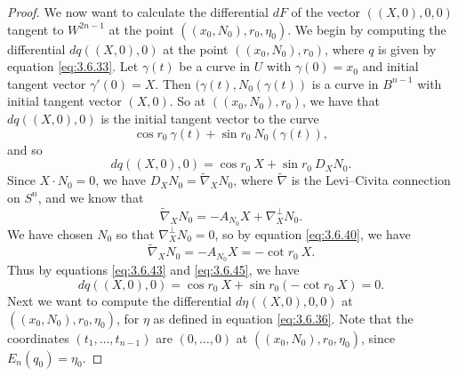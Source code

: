 \documentclass[12pt]{article}
\begin{document}
\begin{proof}
We now want to calculate the differential $dF$ of the vector $((X,0),0,0)$ tangent to 
$W^{2n-1}$ at the point $((x_0,N_0),r_0,\eta_0)$.
We begin by computing the differential
$dq((X,0),0)$ at the point $((x_0,N_0),r_0)$, where $q$ is given by equation \eqref{eq:3.6.33}.  Let $\gamma (t)$
be a curve in $U$ with $\gamma(0) = x_0$ and initial tangent vector $\gamma'(0) = X$.  Then $(\gamma(t),N_0(\gamma(t))$
is a curve in $B^{n-1}$ with initial tangent vector $(X,0)$.  So at $((x_0,N_0),r_0)$, we have that
$dq((X,0),0)$ is the initial tangent vector to the curve
\begin{equation}
\label{eq:3.6.42}
\cos r_0\  \gamma(t) + \sin r_0\  N_0(\gamma(t)),
\end{equation}
and so
\begin{equation}
\label{eq:3.6.43}
dq((X,0),0) = \cos r_0\  X + \sin r_0\  D_X N_0.
\end{equation}
Since $X \cdot N_0 = 0$, we have $D_X N_0 = \widetilde{\nabla}_X N_0$, where $\widetilde{\nabla}$ is the Levi--Civita
connection on $S^n$, and we know that
\begin{equation}
\label{eq:3.6.44}
\widetilde{\nabla}_X N_0 = - A_{N_0} X + \nabla_X^\perp N_0.
\end{equation}
We have chosen $N_0$ so that $\nabla_X^\perp N_0 = 0$, so by equation \eqref{eq:3.6.40}, we have
\begin{equation}
\label{eq:3.6.45}
\widetilde{\nabla}_X N_0 = - A_{N_0} X = - \cot r_0\  X.
\end{equation}
Thus by equations \eqref{eq:3.6.43} and \eqref{eq:3.6.45}, we have
\begin{equation}
\label{eq:3.6.46}
dq((X,0),0) = \cos r_0\  X + \sin r_0 (- \cot r_0\  X) = 0.
\end{equation}
Next we want to compute the differential $d\eta ((X,0),0,0)$ at $((x_0,N_0),r_0,\eta_0)$, 
for $\eta$ as defined in equation \eqref{eq:3.6.36}. Note that the coordinates $(t_1,\ldots,t_{n-1})$ are
$(0,\ldots,0)$ at $((x_0,N_0),r_0,\eta_0)$, since $E_n(q_0) = \eta_0$. 


\end{proof}
\end{document}
